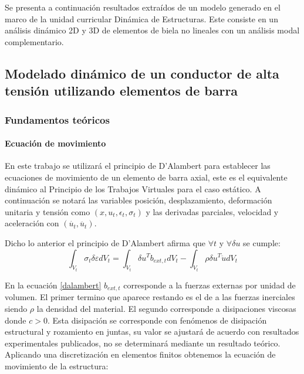\chapter{}\label{Ane2}
Se presenta a continuación resultados extraídos de un modelo generado en el marco de la unidad curricular Dinámica de Estructuras. Este consiste en un análisis dinámico 2D y 3D de elementos de biela no lineales con un análisis modal complementario.  


\section{Modelado dinámico de un conductor de alta tensión utilizando elementos de barra}
\subsection{Fundamentos teóricos}

\subsubsection{Ecuación de movimiento}

En este trabajo se utilizará el principio de D’Alambert para establecer las ecuaciones de movimiento de un elemento de barra axial, este es el equivalente dinámico al Principio de los Trabajos Virtuales para el caso estático. A continuación se notará las variables posición, desplazamiento, deformación unitaria y tensión como $(x, u_t ,\epsilon_t,\sigma_t )$  y las derivadas parciales, velocidad y aceleración con $(\dot{u_t} , \ddot{u_t})$.



Dicho lo anterior el principio de D’Alambert afirma que $\forall t$ y $\forall \delta u $ se cumple:
\begin{equation}\label{dalambert}
	\int_{V_t}\sigma_t\delta \varepsilon dV_t=\int_{V_t}\delta u^Tb_{ext,t}dV_t-\int_{V_t}\rho\delta u^T\ddot{u} dV_t
\end{equation}


En la ecuación \eqref{dalambert} $b_{ext,t}$ corresponde a la fuerzas externas por unidad de volumen. El primer termino que aparece restando es el de a las fuerzas inerciales siendo $\rho$ la densidad del material. El segundo corresponde a disipaciones viscosas donde $c>0$. Esta disipación se corresponde con fenómenos de disipación estructural y rozamiento en juntas,  su valor se ajustará de acuerdo con resultados experimentales publicados, no se determinará mediante un resultado teórico. Aplicando una discretización en elementos finitos obtenemos la ecuación de movimiento de la estructura:

